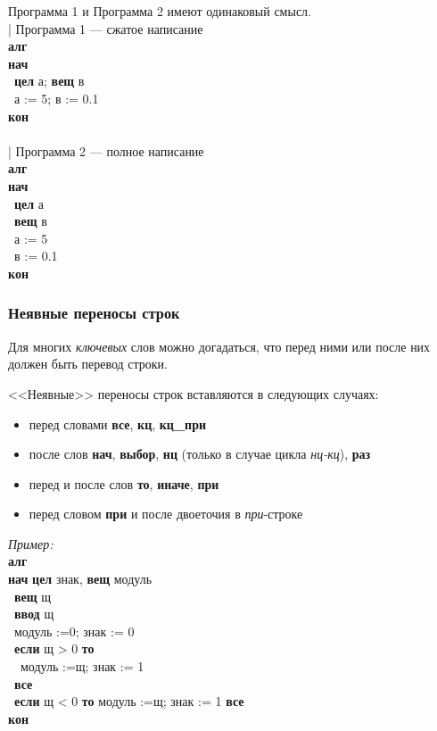 \documentclass[12pt,a4paper]{article}
\newcommand{\otstup}{\textperiodcentered\ }
\begin{document}
Программа 1 и Программа 2 имеют одинаковый смысл.\\
{\sffamily
| Программа 1 --- сжатое написание\\
\textbf{алг}\\
\textbf{нач}\\
\otstup \textbf{цел} а; \textbf{вещ} в\\
\otstup а := 5; в := 0.1\\
\textbf{кон} \\
~\\
| Программа 2 --- полное написание\\
\textbf{алг}\\
\textbf{нач}\\
\otstup \textbf{цел} а\\
\otstup \textbf{вещ} в\\
\otstup а := 5\\
\otstup в := 0.1\\
\textbf{кон}
}

\subsubsection{Неявные переносы строк}

Для многих \emph{ключевых} слов можно догадаться, что перед ними или после них должен быть перевод строки.

<<Неявные>> переносы строк вставляются в следующих случаях:
\begin{itemize}
\item перед словами \textbf{все}, \textbf{кц}, \textbf{кц\_при}
\item после слов \textbf{нач}, \textbf{выбор}, \textbf{нц} (только в случае цикла \emph{нц-кц}), \textbf{раз}
\item перед и после слов \textbf{то}, \textbf{иначе}, \textbf{при}
\item перед словом \textbf{при} и после двоеточия в \emph{при}-строке
\end{itemize}

\emph{Пример:}\\
{\sffamily
\textbf{алг}\\
\textbf{нач} \textbf{цел} знак, \textbf{вещ} модуль\\
\otstup \textbf{вещ} щ\\
\otstup \textbf{ввод} щ\\
\otstup модуль :=0; знак := 0\\
\otstup \textbf{если} щ > 0 \textbf{то}\\
\otstup \otstup модуль :=щ; знак := 1\\
\otstup \textbf{все}\\
\otstup \textbf{если} щ < 0 \textbf{то} модуль :=щ; знак := 1 \textbf{все}\\
\textbf{кон}
}
\end{document}
